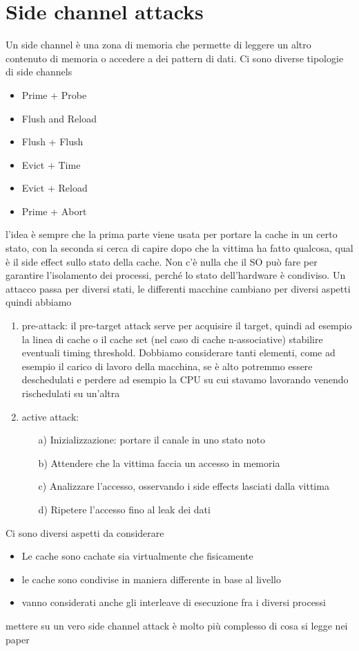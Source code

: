 \documentclass[12pt, oneside]{extbook} %
\begin{document}
\section{Side channel attacks}
Un side channel è una zona di memoria che permette di leggere un altro contenuto di memoria o accedere a dei pattern di dati. Ci sono diverse tipologie di side channels
\begin{itemize}
\item Prime + Probe
\item Flush and Reload
\item Flush + Flush
\item Evict + Time
\item Evict + Reload
\item Prime + Abort
\end{itemize}
l'idea è sempre che la prima parte viene usata per portare la cache in un certo stato, con la seconda si cerca di capire dopo che la vittima ha fatto qualcosa, qual è il side effect sullo stato della cache. Non c'è nulla che il SO può fare per garantire l'isolamento dei processi, perché lo stato dell'hardware è condiviso. Un attacco passa per diversi stati, le differenti macchine cambiano per diversi aspetti quindi abbiamo
\begin{enumerate}
\item pre-attack: il pre-target attack serve per acquisire il target, quindi ad esempio la linea di cache o il cache set (nel caso di cache n-associative) stabilire eventuali timing threshold. Dobbiamo considerare tanti elementi, come ad esempio il carico di lavoro della macchina, se è alto potremmo essere deschedulati e perdere ad esempio la CPU su cui stavamo lavorando venendo rischedulati su un'altra
\item active attack:
\begin{itemize}
\item[a)] Inizializzazione: portare il canale in uno stato noto
\item[b)] Attendere che la vittima faccia un accesso in memoria
\item[c)] Analizzare l'accesso, osservando i side effects lasciati dalla vittima
\item[d)] Ripetere l'accesso fino al leak dei dati
\end{itemize}
\end{enumerate}
Ci sono diversi aspetti da considerare
\begin{itemize}
\item Le cache sono cachate sia virtualmente che fisicamente
\item le cache sono condivise in maniera differente in base al livello
\item vanno considerati anche gli interleave di esecuzione fra i diversi processi
\end{itemize}
mettere su un vero side channel attack è molto più complesso di cosa si legge nei paper
\end{document}
